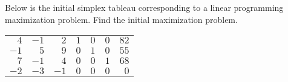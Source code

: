 \documentclass[11pt,letterpaper]{article}
\begin{document}
\newpage



 Below is the initial simplex tableau corresponding to a linear programming maximization problem. Find the initial maximization problem. \par
	\begin{table}[H]
	\centering
	\begin{tabular}{rrrrrrr}
	$4$ & $-1$ & $2$ & $1$ & $0$ & $0$ & $82$ \\
	$-1$ & $5$ & $9$ & $0$ & $1$ & $0$ & $55$ \\
	$7$ & $-1$ & $4$ & $0$ & $0$ & $1$ & $68$ \\
	$-2$ & $-3$ & $-1$ & $0$ & $0$ & $0$ & $0$ 
	\end{tabular}
	\end{table} \pspace
\end{document}
